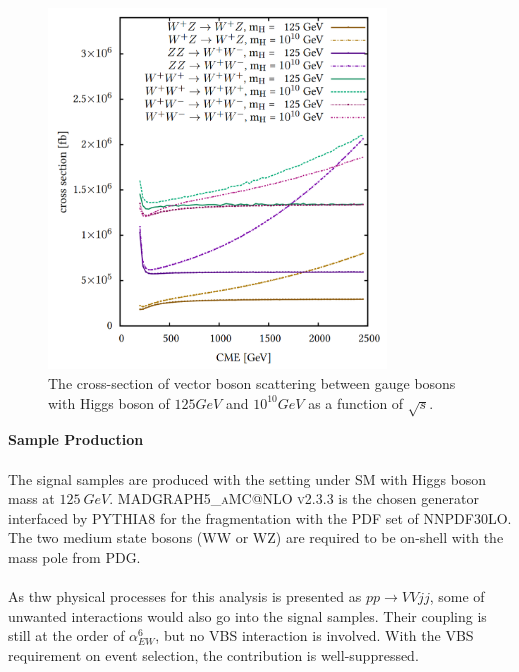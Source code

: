 \begin{figure}[tbp]
	\begin{center}
		\includegraphics[width=0.8\textwidth,keepaspectratio]{Chapter5/VBSXS_heavyhiggs.png}
		\caption{The cross-section of vector boson scattering between gauge bosons with Higgs boson of $125GeV$ and $10^{10}GeV$ as a function of $\sqrt{s}$.\cite{Schnoor:2000941}}
		\label{Fig:VBSXS_heavyhiggs}
	\end{center}
\end{figure} 
\noindent
{\bf Sample Production}
\\
\\The signal samples are produced with the setting under SM with Higgs boson mass at $125~GeV$. \textsc{MADGRAPH5\_aMC@NLO v2.3.3}\cite{Alwall:2014hca} is the chosen generator interfaced by \textsc{PYTHIA8}\cite{Sjostrand:2007gs} for the fragmentation with the PDF set of \textsc{NNPDF30LO}\cite{Ball:2012cx}. The two medium state bosons (WW or WZ) are required to be on-shell with the mass pole from PDG. 
\\
\\As thw physical processes for this analysis is presented as $pp \to VVjj$, some of unwanted interactions would also go into the signal samples. Their coupling is still at the order of $\alpha_{EW}^6$, but no VBS interaction is involved. With the VBS requirement on event selection, the contribution is well-suppressed. 
\noindent
